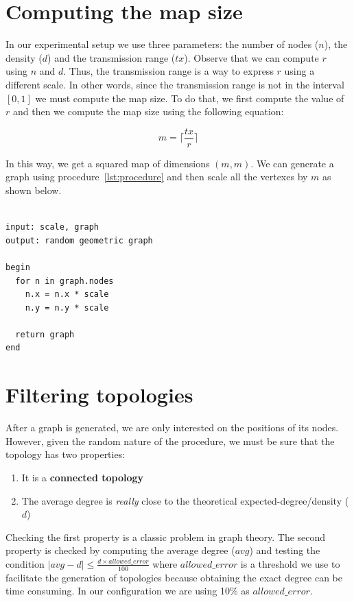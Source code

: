 \documentclass[12pt,a4paper]{report}
\begin{document}
\section{Computing the map size}

In our experimental setup we use three parameters: the number of nodes ($n$), the density ($d$) and the transmission range ($tx$). Observe that we can compute $r$ using $n$ and $d$. Thus, the transmission range is a way to express $r$ using a different scale.
In other words, since the transmission range is not in the interval $[0, 1]$ we must compute the map size. To do that, we first compute the value of $r$ and then we compute the map size using the following equation:

\[
m = \lceil {\frac{tx}{r}} \rceil
\]

In this way, we get a squared map of dimensions $(m,m)$. We can generate a graph using procedure~\ref{lst:procedure} and then scale all the vertexes by $m$ as shown below.

\begin{lstlisting}[label={lst:scaling}, caption="Procedure to scale a RGG"]

input: scale, graph
output: random geometric graph

begin
  for n in graph.nodes
    n.x = n.x * scale
    n.y = n.y * scale

  return graph
end

\end{lstlisting}

\section{Filtering topologies}

After a graph is generated, we are only interested on the positions of its nodes. However, given the random nature of the procedure, we must be sure that the topology has two properties:
\begin{enumerate}
	\item It is a \textbf{connected topology}
	\item The average degree is \textit{really} close to the theoretical expected-degree/density ($d$)
\end{enumerate}

Checking the first property is a classic problem in graph theory.
The second property is checked by computing the average degree ($\textit{avg}$) and testing the condition $\lvert{avg - d}\rvert \leq \frac {d \times allowed\_error}{100}$ where $allowed\_error$ is a threshold we use to facilitate the generation of topologies because obtaining the exact degree can be time consuming. In our configuration we are using 10\% as $allowed\_error$. 
\end{document}
